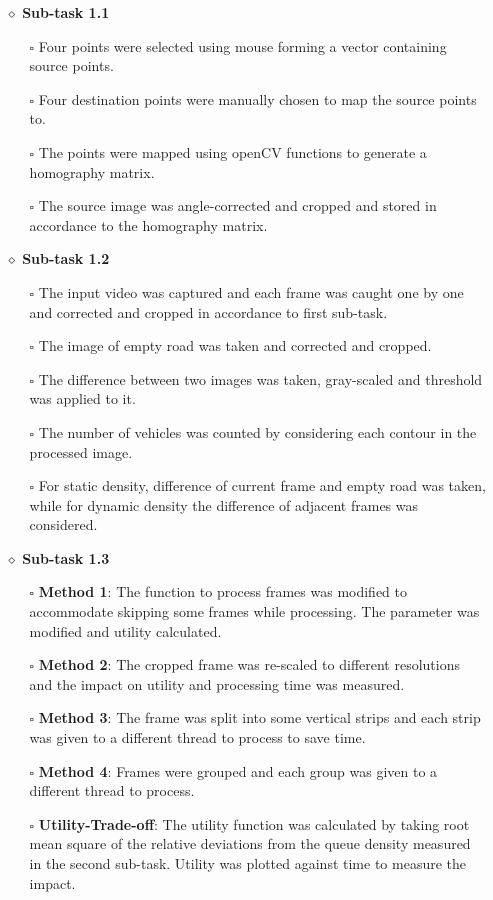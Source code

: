 \documentclass{article} %
\begin{document}
\begin{itemize}
    \item[$\diamond$] \textbf{Sub-task 1.1}
    \begin{itemize}
        \item[$\square$] Four points were selected using mouse forming a vector containing source points.
        \item[$\square$] Four destination points were manually chosen to map the source points to.
        \item[$\square$] The points were mapped using openCV functions to generate a homography matrix.
        \item[$\square$] The source image was angle-corrected and cropped and stored in accordance to the homography matrix.
    \end{itemize}
    \item[$\diamond$] \textbf{Sub-task 1.2}
    \begin{itemize}
        \item[$\square$] The input video was captured and each frame was caught one by one and corrected and cropped in accordance to first sub-task.
        \item[$\square$] The image of empty road was taken and corrected and cropped.
        \item[$\square$] The difference between two images was taken, gray-scaled and threshold was applied to it.
        \item[$\square$] The number of vehicles was counted by considering each contour in the processed image.
        \item[$\square$] For static density, difference of current frame and empty road was taken, while for dynamic density the difference of adjacent frames was considered.
    \end{itemize}
    \item[$\diamond$] \textbf{Sub-task 1.3}
    \begin{itemize}
        \item[$\square$] \textbf{Method 1}: The function to process frames was modified to accommodate skipping some frames while processing. The parameter was modified and utility calculated.
        \item[$\square$] \textbf{Method 2}: The cropped frame was re-scaled to different resolutions and the impact on utility and processing time was measured.
        \item[$\square$] \textbf{Method 3}: The frame was split into some vertical strips and each strip was given to a different thread to process to save time.
        \item[$\square$] \textbf{Method 4}: Frames were grouped and each group was given to a different thread to process.
        \item[$\square$] \textbf{Utility-Trade-off}: The utility function was calculated by taking root mean square of the relative deviations from the queue density measured in the second sub-task. Utility was plotted against time to measure the impact.
    \end{itemize}
\end{itemize}
\end{document}

